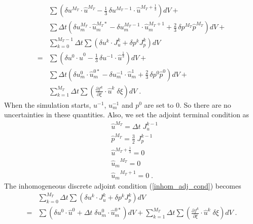 \begin{equation} \label{inhom_adj_cond} \begin{split}
 & \sum \left( \delta u^{M_T} \cdot \hat u^{M_T} -
   \frac13\, \delta u^{M_T-1} \cdot \hat u^{M_T+\frac13} \right) dV + \\
 & \sum \Delta t \left( \delta u_m^{M_T} \cdot \hat u_m^{M_T*} -
                  \delta u_m^{M_T-1} \cdot \hat u_m^{M_T+1} +
                  \frac23\, \delta p^{M_T} \hat p^{M_T} \right) dV + \\
 & \sum_{k=0}^{M_T-1} \Delta t
 \sum \left( \delta u^{k} \cdot J_u^{k}
           + \delta p^{k} J_p^{k} \right) dV \\
=& \sum \left( \delta u^0 \cdot \hat u^0 -
   \frac13\, \delta u^{-1} \cdot \hat u^{\frac13} \right) dV + \\
 & \sum \Delta t \left( \delta u_m^0 \cdot \hat u_m^{0*} -
                  \delta u_m^{-1} \cdot \hat u_m^{1} +
                  \frac23\, \delta p^0 \hat p^0 \right) dV + \\
 & \sum_{k=1}^{M_T} \Delta t
 \sum \left(\frac{\partial f^k}{\partial \xi} \cdot {\hat u}^k
                 \;\delta\xi\right) dV \;.
\end{split}\end{equation}
When the simulation starts, $u^{-1}$, $u_m^{-1}$ and $p^0$ are set to 0.
So there are no uncertainties in these quantities.
Also, we set the adjoint terminal condition as
\begin{equation} \begin{split} \label{source_adjns}
& {\hat u}^{M_T} = \Delta t\; J_u^{k-1} \\
& {\hat p}^{M_T} = \frac32\; J_p^{k-1} \\
& {\hat u}^{M_T+\frac13} = 0 \\
& {\hat u_m}^{M_T} = 0 \\
& {\hat u_m}^{M_T+1} = 0  \;.
\end{split} \end{equation}
The inhomogeneous discrete adjoint condition (\ref{inhom_adj_cond}) becomes
\[\begin{split}
 & \sum_{k=0}^{M_T} \Delta t
 \sum \left( \delta u^{k} \cdot J_u^{k}
           + \delta p^{k} J_p^{k} \right) dV \\
=& \sum \left( \delta u^0 \cdot \hat u^0 +
 \Delta t\; \delta u_m^0 \cdot \hat u_m^{0*} \right) dV +
 \sum_{k=1}^{M_T} \Delta t
 \sum \left(\frac{\partial f^k}{\partial \xi} \cdot {\hat u}^k
                 \;\delta\xi\right) dV  \;.
\end{split}\]
